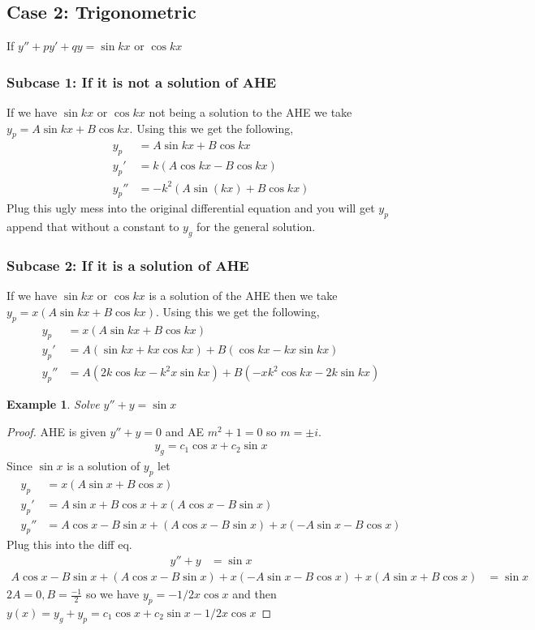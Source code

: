 \documentclass[oneside,11pt,pdftex,final]{book}%
\numberwithin{equation}{section}
\newtheorem{example}[theorem]{Example}
\numberwithin{section}{chapter}
\numberwithin{equation}{chapter}
\begin{document}
\subsection{Case 2: Trigonometric}
If $ y''+py'+qy=\sin kx $ or $ \cos kx $
\subsubsection{Subcase 1: If it is not a solution of AHE}
If we have $ \sin kx  $  or $ \cos kx  $ not being a solution to the AHE we take $ y_p=A \sin kx + B \cos kx $. Using this we get the following,
\begin{align*}
	y_p&=A \sin kx + B \cos kx\\
	y_p'&=k(A \cos kx - B \cos kx)\\
	y_p''&=-k^2(A \sin (kx)+B \cos kx)
\end{align*}
Plug this ugly mess into the original differential equation and you will get $ y_p $ append that without a constant to $ y_g $ for the general solution.

\subsubsection{Subcase 2: If it is a solution of AHE}
If we have $ \sin kx  $ or $ \cos kx  $ is a solution of the AHE then we take $ y_p=x(A \sin kx + B \cos kx) $. Using this we get the following,
\begin{align*}
	y_p&=x(A \sin kx + B \cos kx)\\
	y_p'&=A(\sin kx + kx \cos kx)+B(\cos kx - kx \sin kx)\\
	y_p''&=A(2k \cos kx - k^2 x \sin kx)+B(-x k^2 \cos kx - 2k \sin kx)
\end{align*}
\begin{example}
	Solve $ y''+y=\sin x $
\end{example}
\begin{proof}
	AHE is given $ y''+y=0 $ and AE $ m^2+1=0 $ so $ m=\pm i $.
	\begin{align*}
		y_g=c_1\cos x + c_2 \sin  x
	\end{align*}
Since $ \sin x $ is a solution of $ y_p $ let 
\begin{align*}
	 y_p&=x(A \sin x + B \cos x) \\
	 y_p'&=A \sin x + B \cos x + x (A \cos x - B \sin x)\\
	 y_p''&= A \cos x - B \sin x + (A \cos x - B \sin x)+ x(-A \sin x - B \cos x)
\end{align*}
Plug this into the diff eq.
\begin{align*}
	y''+y&=\sin x
\end{align*}
\begin{align*}
	A \cos x - B \sin x + (A \cos x - B \sin x)+ x(-A \sin x - B \cos x) + x(A \sin x + B \cos x)&= \sin x
\end{align*}
$ 2A=0, B=\frac{-1}{2} $ so we have $ y_p=-1/2 x \cos x $ and then $ y(x)=y_g+y_p=c_1\cos x + c_2 \sin x - 1/2 x \cos x  $
\end{proof}
\end{document}
